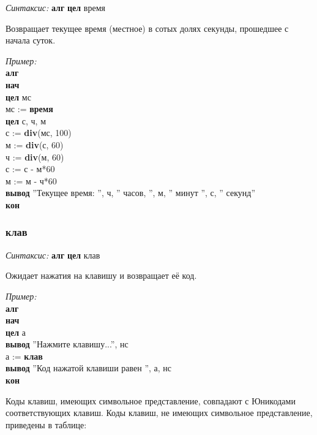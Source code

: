 \emph{Синтаксис:} \textbf{алг} \textbf{цел} время

Возвращает текущее время (местное) в сотых долях секунды, прошедшее с начала суток.

\emph{Пример:}
\sffamily~\\
\textbf{алг}\\
\textbf{нач}\\
\otstup \textbf{цел} мс\\
\otstup мс := \textbf{время}\\
\textbf{цел} с, ч, м\\
\otstup с := \textbf{div}(мс, 100)\\
\otstup м := \textbf{div}(с, 60)\\
\otstup ч := \textbf{div}(м, 60)\\
\otstup с := с - м*60\\
\otstup м := м - ч*60\\
\otstup \textbf{вывод} ''Текущее время: '', ч, '' часов, '', м, '' минут '', с, '' секунд''\\
\textbf{кон}\\


\normalfont
\subsubsection{клав}

\emph{Синтаксис:} \textbf{алг} \textbf{цел} клав


      
				Ожидает нажатия на клавишу и возвращает её код.
      
\emph{Пример:}      
\sffamily~\\
\textbf{алг}\\
\textbf{нач}\\
\otstup \textbf{цел} а~\\
\otstup \textbf{вывод} ''Нажмите клавишу...'', нс~\\
\otstup а  :=  \textbf{клав}~\\
\otstup \textbf{вывод} ''Код нажатой клавиши равен '', а, нс~\\
\textbf{кон}
\normalfont
      
      Коды клавиш, имеющих символьное представление, совпадают с Юникодами соответствующих клавиш.
      Коды клавиш, не имеющих символьное представление, приведены в таблице:

